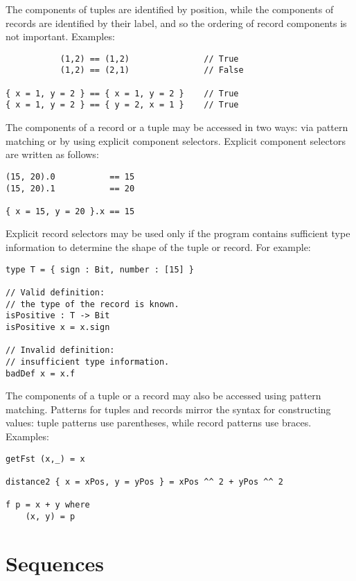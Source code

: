 The components of tuples are identified by position, while the
components of records are identified by their label, and so the ordering
of record components is not important. Examples:

\begin{verbatim}
           (1,2) == (1,2)               // True
           (1,2) == (2,1)               // False

{ x = 1, y = 2 } == { x = 1, y = 2 }    // True
{ x = 1, y = 2 } == { y = 2, x = 1 }    // True
\end{verbatim}

The components of a record or a tuple may be accessed in two ways: via
pattern matching or by using explicit component selectors. Explicit
component selectors are written as follows:

\begin{verbatim}
(15, 20).0           == 15
(15, 20).1           == 20

{ x = 15, y = 20 }.x == 15
\end{verbatim}

Explicit record selectors may be used only if the program contains
sufficient type information to determine the shape of the tuple or
record. For example:

\begin{verbatim}
type T = { sign : Bit, number : [15] }

// Valid definition:
// the type of the record is known.
isPositive : T -> Bit
isPositive x = x.sign

// Invalid definition:
// insufficient type information.
badDef x = x.f
\end{verbatim}

The components of a tuple or a record may also be accessed using pattern
matching. Patterns for tuples and records mirror the syntax for
constructing values: tuple patterns use parentheses, while record
patterns use braces. Examples:

\begin{verbatim}
getFst (x,_) = x

distance2 { x = xPos, y = yPos } = xPos ^^ 2 + yPos ^^ 2

f p = x + y where
    (x, y) = p
\end{verbatim}

\section{Sequences}\label{sequences}

